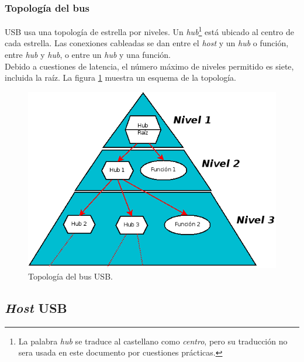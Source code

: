 \subsubsection{Topolog\'ia del bus}

USB usa una topolog\'ia de estrella por niveles. Un \emph{hub}\footnote{La
palabra \emph{hub} se traduce al castellano como \emph{centro}, pero su
traducci\'on no sera usada en este documento por cuestiones pr\'acticas.}
est\'a ubicado al centro de cada estrella. Las conexiones cableadas se dan
entre el \emph{host} y un \emph{hub} o funci\'on, entre \emph{hub} y
\emph{hub}, o entre un \emph{hub} y una funci\'on. \\

Debido a cuestiones de latencia, el n\'umero m\'aximo de niveles permitido es
siete, incluida la ra\'iz. La figura \ref{fig:usb_topology} muestra un esquema
de la topolog\'ia.

\begin{figure}[htp]
\centering
\includegraphics[scale=0.5]{./img/usb_topology.png}
\caption{Topolog\'ia del bus USB.}
\label{fig:usb_topology}
\end{figure}


\subsection{\emph{Host} USB}

